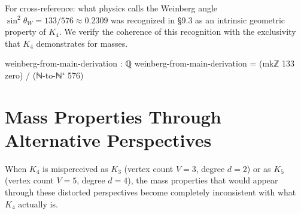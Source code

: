 \documentclass[11pt,a4paper]{book}
\begin{document}
For cross-reference: what physics calls the Weinberg angle $\sin^2\theta_W = 133/576 \approx 0.2309$ was recognized in \S9.3 as an intrinsic geometric property of $K_4$. We verify the coherence of this recognition with the exclusivity that $K_4$ demonstrates for masses.

\begin{code}
weinberg-from-main-derivation : ℚ
weinberg-from-main-derivation = (mkℤ 133 zero) / (ℕ-to-ℕ⁺ 576)
\end{code}

\section{Mass Properties Through Alternative Perspectives}

When $K_4$ is misperceived as $K_3$ (vertex count $V = 3$, degree $d = 2$) or as $K_5$ (vertex count $V = 5$, degree $d = 4$), the mass properties that would appear through these distorted perspectives become completely inconsistent with what $K_4$ actually is.
\end{document}
